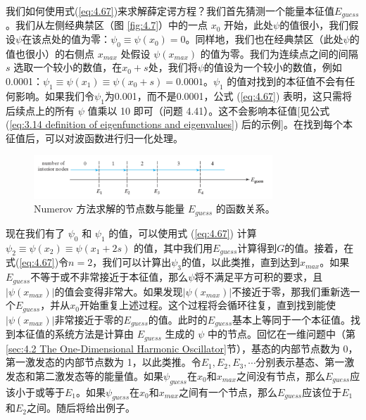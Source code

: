     我们如何使用式(\ref{eq:4.67})来求解薛定谔方程？我们首先猜测一个能量本征值$E_{guess}$。我们从左侧经典禁区（图 \ref{fig:4.7}）中的一点 $x_0$ 开始，此处$\psi$的值很小，我们假设$\psi$在该点处的值为零：$\psi_0 \equiv \psi\left(x_0\right) = 0$。同样地，我们也在经典禁区（此处$\psi$的值也很小）的右侧点 $x_{max}$ 处假设 $\psi\left(x_{max}\right)$ 的值为零。我们为连续点之间的间隔 $s$ 选取一个较小的数值，在$x_0+s$处，我们将$\psi$的值设为一个较小的数值，例如0.0001：$\psi_1 \equiv \psi\left(x_1\right) \equiv \psi\left(x_0+s\right) = 0.0001$。$\psi_1$ 的值对找到的本征值不会有任何影响。如果我们令$\psi_1$为0.001，而不是0.0001，公式 (\ref{eq:4.67}) 表明，这只需将后续点上的所有 $\psi$ 值乘以 10 即可（问题 4.41）。这不会影响本征值[见公式 (\ref{eq:3.14 definition of eigenfunctions and eigenvalues}) 后的示例]。在找到每个本征值后，可以对波函数进行归一化处理。
    \begin{figure}[h!]
        \centering
        \includegraphics[width=0.8\textwidth]{Figures/4.8.png}
        \caption{Numerov 方法求解的节点数与能量 $E_{guess}$ 的函数关系。}
        \label{fig:4.8}
    \end{figure}

    现在我们有了 $\psi_0$ 和 $\psi_1$ 的值，可以使用式 (\ref{eq:4.67}) 计算 $\psi_2 \equiv \psi\left(x_2\right) \equiv \psi\left(x_1+2s\right)$ 的值，其中我们用$E_{guess}$计算得到$G$的值。接着，在式(\ref{eq:4.67})令$n=2$，我们可以计算出$\psi_3$的值，以此类推，直到达到$x_{max}$。如果$E_{guess}$不等于或不非常接近于本征值，那么$\psi$将不满足平方可积的要求，且$\left|\psi\left(x_{max}\right)\right|$的值会变得非常大。如果发现$\left|\psi\left(x_{max}\right)\right|$不接近于零，那我们重新选一个$E_{guess}$，并从$x_0$开始重复上述过程。这个过程将会循环往复，直到找到能使$\left|\psi\left(x_{max}\right)\right|$非常接近于零的$E_{guess}$的值。此时的$E_{guess}$基本上等同于一个本征值。找到本征值的系统方法是计算由 $E_{guess}$ 生成的 $\psi$ 中的节点。回忆在一维问题中（第\ref{sec:4.2 The One-Dimensional Harmonic Oscillator}节），基态的内部节点数为 0，第一激发态的内部节点数为 1，以此类推。令$E_1,E_2,E_3,\cdots$分别表示基态、第一激发态和第二激发态等的能量值。如果$\psi_{guess}$在$x_0$和$x_{max}$之间没有节点，那么$E_{guess}$应该小于或等于$E_1$。如果$\psi_{guess}$在$x_0$和$x_{max}$之间有一个节点，那么$E_{guess}$应该位于$E_1$和$E_2$之间。随后将给出例子。

